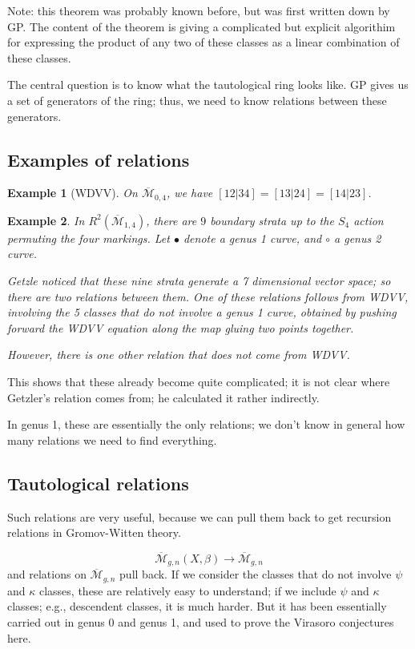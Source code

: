 \documentclass{amsart}
\newtheorem{example}{Example}
\newcommand{\Mbar}{\overline{\mathcal{M}}}
\begin{document}
Note: this theorem was probably known before, but was first written down by GP.  The content of the theorem is giving a complicated but explicit algorithim for expressing the product of any two of these classes as a linear combination of these classes.

The central question is to know what the tautological ring looks like.  GP gives us a set of generators of the ring; thus, we need to know relations between these generators.

\subsection{Examples of relations}

\begin{example}[WDVV]
On $\Mbar_{0,4}$, we have $[12|34]=[13|24]=[14|23]$.
\end{example}


\begin{example}
In $R^2(\Mbar_{1,4})$, there are $9$ boundary strata up to the $S_4$ action permuting the four markings.  Let $\bullet$ denote a genus 1 curve, and $\circ$ a genus 2 curve.  


Getzle noticed that these nine strata generate a 7 dimensional vector space; so there are two relations between them.  One of these relations follows from WDVV, involving the 5 classes that do not involve a genus 1 curve, obtained by pushing forward the WDVV equation along the map gluing two points together.

However, there is one other relation that does not come from WDVV.    
\end{example}

This shows that these already become quite complicated; it is not clear where Getzler's relation comes from; he calculated it rather indirectly.

In genus 1, these are essentially the only relations; we don't know in general how many relations we need to find everything.

\subsection{Tautological relations}
Such relations are very useful, because we can pull them back to get recursion relations in Gromov-Witten theory.

$$\Mbar_{g,n}(X,\beta)\to\Mbar_{g,n}$$
and relations on $\Mbar_{g,n}$ pull back.  If we consider the classes that do not involve $\psi$ and $\kappa$ classes, these are relatively easy to understand; if we include $\psi$ and $\kappa$ classes; e.g., descendent classes, it is much harder.  But it has been essentially carried out in genus 0 and genus 1, and used to prove the Virasoro conjectures here.
\end{document}
